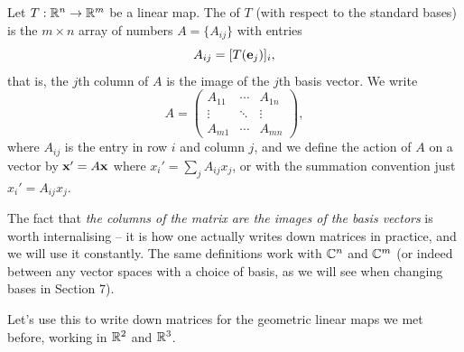\documentclass[a4paper]{scrartcl}
\begin{document}
\begin{definition}
	Let $T: \mathbb{R}^n \rightarrow \mathbb{R}^m$ be a linear map. The  of $T$ (with respect to the standard bases) is the $m \times n$ array of numbers $A = \{A_{ij}\}$ with entries
	$$
	A_{ij} = [T(\mathbf{e}_j)]_i,
	$$
	that is, the $j$th column of $A$ is the image of the $j$th basis vector. We write
	$$
	A = \begin{pmatrix}
		A_{11} & \cdots & A_{1n} \\
		\vdots & \ddots & \vdots \\
		A_{m1} & \cdots & A_{mn}
	\end{pmatrix},
	$$
	where $A_{ij}$ is the entry in row $i$ and column $j$, and we define the action of $A$ on a vector by $\mathbf{x}' = A \mathbf{x}$ where $x_i' = \sum_{j} A_{ij} x_j$, or with the summation convention just $x_i' = A_{ij}x_j$.
\end{definition}

The fact that \emph{the columns of the matrix are the images of the basis vectors} is worth internalising -- it is how one actually writes down matrices in practice, and we will use it constantly. The same definitions work with $\mathbb{C}^n$ and $\mathbb{C}^m$ (or indeed between any vector spaces with a choice of basis, as we will see when changing bases in Section 7).

Let's use this to write down matrices for the geometric linear maps we met before, working in $\mathbb{R}^2$ and $\mathbb{R}^3$.
\end{document}

